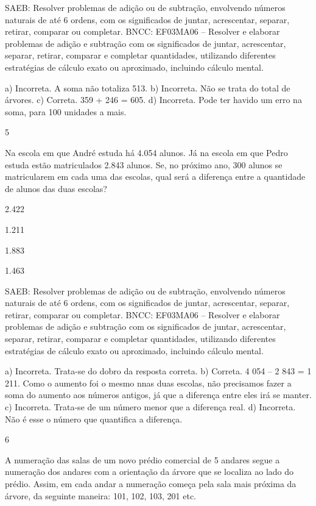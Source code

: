 \begin{multicols}{2}
\begin{enumerate}
{SAEB: Resolver problemas de adição ou de subtração,
envolvendo números naturais de até 6 ordens, com os significados de
juntar, acrescentar, separar, retirar, comparar ou completar.
BNCC: EF03MA06 – Resolver e elaborar problemas de adição e subtração com os significados de
juntar, acrescentar, separar, retirar, comparar e completar quantidades, utilizando diferentes
estratégias de cálculo exato ou aproximado, incluindo cálculo mental.

a) Incorreta. A soma não totaliza 513.
b) Incorreta. Não se trata do total de árvores.
c) Correta. 359 + 246 = 605.
d) Incorreta. Pode ter havido um erro na soma, para 100 unidades a mais.

\num{5}

Na escola em que André estuda há 4.054 alunos. Já na escola em que
Pedro estuda estão matriculados 2.843 alunos. Se, no próximo ano, 300
alunos se matricularem em cada uma das escolas, qual será a diferença
entre a quantidade de alunos das duas escolas?

\begin{escolha}
\item
  2.422
\item
  1.211
\item
  1.883
\item
  1.463
\end{escolha}


SAEB: Resolver problemas de adição ou de subtração,
envolvendo números naturais de até 6 ordens, com os significados de
juntar, acrescentar, separar, retirar, comparar ou completar.
BNCC: EF03MA06 – Resolver e elaborar problemas de adição e subtração com os significados de
juntar, acrescentar, separar, retirar, comparar e completar quantidades, utilizando diferentes
estratégias de cálculo exato ou aproximado, incluindo cálculo mental.

a) Incorreta. Trata-se do dobro da resposta correta.
b) Correta. 4 054 -- 2 843 = 1 211. Como o aumento foi o mesmo nnas duas escolas, não
precisamos fazer a soma do aumento aos números antigos, já que a diferença entre eles irá se manter.
c) Incorreta. Trata-se de um número menor que a diferença real.
d) Incorreta. Não é esse o número que quantifica a diferença.

\num{6}

A numeração das salas de um novo prédio comercial de 5 andares segue a
numeração dos andares com a orientação da árvore que se localiza ao
lado do prédio. Assim, em cada andar a numeração começa pela sala mais
próxima da árvore, da seguinte maneira: 101, 102, 103, 201 etc.

}
\end{enumerate}
\end{multicols}
